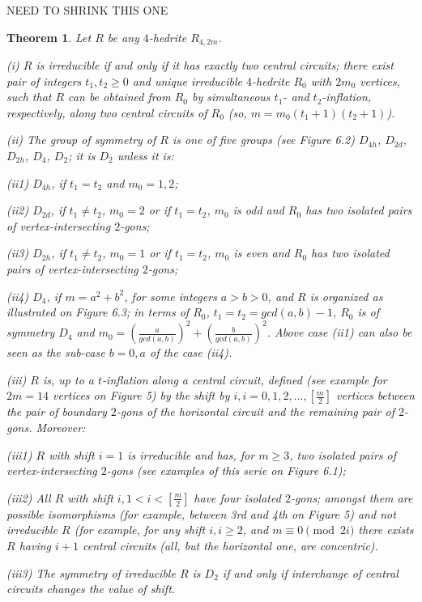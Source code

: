 \documentclass[12pt]{article}
\newtheorem{theor}{Theorem}
\begin{document}
NEED TO SHRINK THIS ONE
\begin{theor}

Let $R$ be any $4$-hedrite $R_{4,2m}$.

(i) $R$ is irreducible if and only if it has exactly two central
circuits; there exist pair of integers
$t_1,t_2 \ge 0$ and
unique irreducible $4$-hedrite $R_0$ with $2m_0$ vertices, such that $R$ can be obtained from
$R_0$ by simultaneous $t_1$- and $t_2$-inflation, respectively, along two
central circuits of $R_0$ (so, $m=m_0(t_1+1)(t_2+1)$).

(ii) The group of symmetry of $R$ is one of five groups (see Figure 6.2)
$D_{4h}$, $D_{2d}$, $D_{2h}$, $D_4$, $D_2$; it is $D_2$ unless it is:     

(ii1) $D_{4h}$, if $t_1=t_2$ and $m_0=1,2$;

(ii2) $D_{2d}$, if $t_1 \neq t_2$, $m_0=2$ or if $t_1=t_2$, $m_0$ is odd
and $R_0$ has two isolated pairs of vertex-intersecting $2$-gons;

(ii3) $D_{2h}$, if $t_1 \neq t_2$, $m_0=1$ or if $t_1=t_2$, $m_0$ is even
and $R_0$ has two isolated pairs of vertex-intersecting $2$-gons;

(ii4) $D_4$, if $m=a^2+b^2$, for some integers $a>b>0$, and $R$ is organized as illustrated on Figure 6.3; in terms of $R_0$, 
$t_1=t_2=gcd(a,b)-1$, $R_0$ is of symmetry $D_4$ and 
$m_0=(\frac{a}{gcd(a,b)})^2+(\frac{b}{gcd(a,b)})^2$. Above case (ii1) can also
be seen as the sub-case $b=0,a$ of the case (ii4).

(iii) $R$ is, up to a $t$-inflation along a central 
circuit, defined (see example for $2m=14$ vertices on Figure 5) by the shift by $i, i=0,1,2,..., [\frac{m}{2}]$ vertices between the pair
of boundary $2$-gons of the horizontal circuit and the remaining pair of
$2$-gons. Moreover:

(iii1) $R$ with shift $i=1$ is irreducible and has, for $m \ge 3$,
two isolated pairs of vertex-intersecting $2$-gons (see examples of this serie
on Figure 6.1);

(iii2) All $R$ with shift $i, 1<i< [\frac{m}{2}]$ have four isolated $2$-gons;
amongst them are possible isomorphisms (for example, between 3rd and 4th on
Figure 5) and not irreducible $R$ (for example,
for any shift $i, i \ge 2$, and $m \equiv0\pmod{2i}$ there exists  
$R$
having $i+1$ central circuits (all, but the horizontal one, are concentric).
  
(iii3) The symmetry of irreducible $R$ is $D_2$ if and only if interchange of 
central circuits changes the value of shift.

\end{theor}
\end{document}
